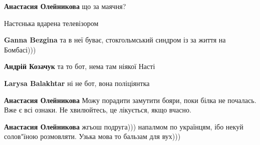\begin{itemize}
\begin{itemize}
\textbf{Анастасия Олейникова} що за маячня?

 
Настєнька вдарена телевізором

 
\textbf{Ganna Bezgina} та в неї буває, стокгольмський синдром із за життя на Бомбасі)))

 
\textbf{Андрій Козачук} та то бот, нема там ніякої Насті

 
\textbf{Larysa Balakhtar} ні не бот, вона поліціянтка

 
\textbf{Анастасия Олейникова} Можу порадити замутити бояри, поки білка не почалась. Вже є всі ознаки. Не хвилюйтесь, це лікується, якщо вчасно.

 
\textbf{Анастасия Олейникова} жгьош подруга))) напалмом по українцям, ібо некуй
солов"їною розмовляти. Узька мова то бальзам для вух)))


\end{itemize}
\end{itemize}
